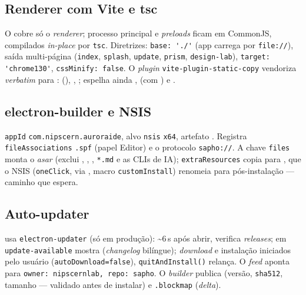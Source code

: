 \subsection{Renderer com Vite e tsc}
\label{sec:S13-vite}
O  cobre só o \emph{renderer}; processo principal e \emph{preloads} ficam em CommonJS, compilados \emph{in-place} por \texttt{tsc}. Diretrizes: \lstinline|base: './'| (app carrega  por \texttt{file://}), saída multi-página (\texttt{index}, \texttt{splash}, \texttt{update}, \texttt{prism}, \texttt{design-lab}), \lstinline|target: 'chrome130'|, \lstinline|cssMinify: false|. O \emph{plugin} \lstinline|vite-plugin-static-copy| vendoriza \emph{verbatim} para :  (), , ; espelha ainda ,  (com ) e .

\subsection{electron-builder e NSIS}
\label{sec:S13-builder}
\texttt{appId} \lstinline|com.nipscern.auroraide|, alvo \texttt{nsis} \texttt{x64}, artefato . Registra \texttt{fileAssociations} \texttt{.spf} (papel Editor) e o protocolo \lstinline|sapho://|. A chave \texttt{files} monta o \emph{asar} (exclui , , , \texttt{*.md} e as CLIs de IA); \texttt{extraResources} copia  para , que o NSIS (\texttt{oneClick}, via , macro \texttt{customInstall}) renomeia para  pós-instalação --- caminho que  espera.

\subsection{Auto-updater}
\label{sec:S13-updater}
 usa \lstinline|electron-updater| (só em produção): \textasciitilde{}6\,s após abrir, verifica \emph{releases}; em \texttt{update-available} mostra  (\emph{changelog} bilíngue); \emph{download} e instalação iniciados pelo usuário (\lstinline|autoDownload=false|), \lstinline|quitAndInstall()| relança. O \emph{feed} aponta para \lstinline|owner: nipscernlab, repo: sapho|. O \emph{builder} publica  (versão, \texttt{sha512}, tamanho --- validado antes de instalar) e \texttt{.blockmap} (\emph{delta}).

